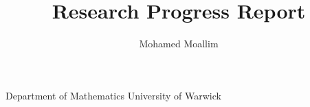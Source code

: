 \documentclass[a4paper,11pt]{article}
\title{Research Progress Report}
\author{Mohamed Moallim}
\begin{document}
Department of Mathematics University of Warwick
\end{document}
